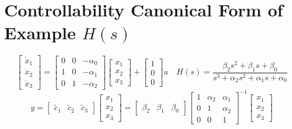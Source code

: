 \documentclass[10pt,a4paper,oneside]{article}
\begin{document}
\section{Controllability Canonical Form of Example $H(s)$}
\[
\left[\begin{array}{c}{\dot{x}_{1}} \\ {\dot{x}_{2}} \\ {\dot{x}_{3}}\end{array}\right]=\left[\begin{array}{ccc}{0} & {0} & {-\alpha_{0}} \\ {1} & {0} & {-\alpha_{1}} \\ {0} & {1} & {-\alpha_{2}}\end{array}\right]\left[\begin{array}{c}{x_{1}} \\ {x_{2}} \\ {x_{3}}\end{array}\right]+\left[\begin{array}{c}{1} \\ {0} \\ {0}\end{array}\right] u \quad H(s)=\frac{\beta_{2} s^{2}+\beta_{1} s+\beta_{0}}{s^{3}+\alpha_{2} s^{2}+\alpha_{1} s+\alpha_{0}}
\]
\[
y=\left[\begin{array}{lll}{\tilde{c}_{1}} & {\tilde{c}_{2}} & {\tilde{c}_{3}}\end{array}\right]\left[\begin{array}{l}{x_{1}} \\ {x_{2}} \\ {x_{3}}\end{array}\right]=\left[\begin{array}{lll}{\beta_{2}} & {\beta_{1}} & {\beta_{0}}\end{array}\right]\left[\begin{array}{ccc}{1} & {\alpha_{2}} & {\alpha_{1}} \\ {0} & {1} & {\alpha_{2}} \\ {0} & {0} & {1}\end{array}\right]^{-1}\left[\begin{array}{l}{x_{1}} \\ {x_{2}} \\ {x_{3}}\end{array}\right]
\]
\end{document}
